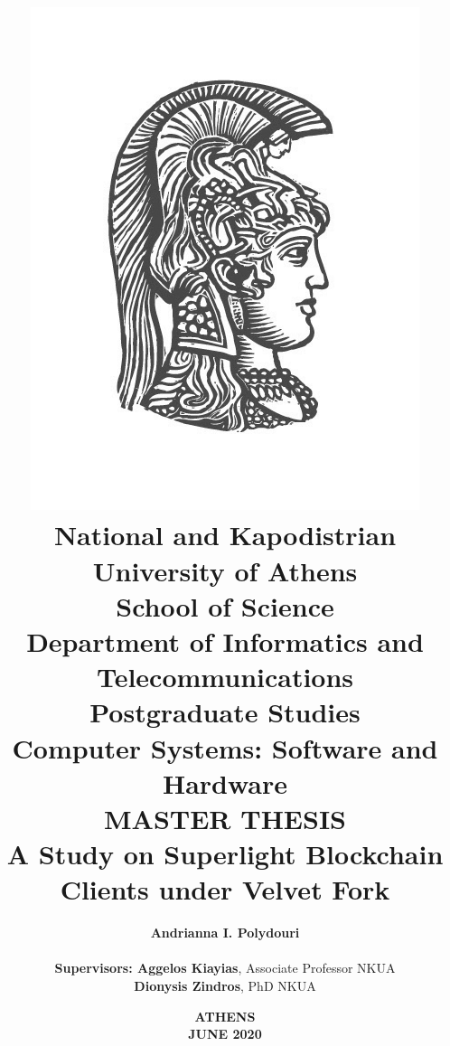 \title{
    {\includegraphics[scale=0.7]{figures/logo_uoa.jpg}}\\
    {\Large \textbf{National and Kapodistrian University of Athens}} \\
    {\large \textbf{School of Science \\
    Department of Informatics and Telecommunications}}\\
    \vspace{0.4cm}
    \textbf{\large Postgraduate Studies}\\
    \textbf{\large Computer Systems: Software and Hardware}\\
    \vspace{10mm}
    {\large \textbf{MASTER THESIS}}\\
    \vspace{3mm}
    {\textbf{\Large A Study on Superlight Blockchain Clients under Velvet Fork}}\\
    \vspace{0.8cm}
    }

\author{
    \textbf{\normalsize Andrianna I. Polydouri} \\
    \vspace{0.8cm} \\
    \textbf{\normalsize Supervisors: Aggelos Kiayias}, \normalsize Associate Professor NKUA\\
    \hspace{0.35cm}
    \textbf{\normalsize Dionysis Zindros}, \normalsize PhD NKUA
    \vspace{0.7cm}
}

\date{\normalsize \textbf{ATHENS \\ JUNE 2020}}
\pagebreak